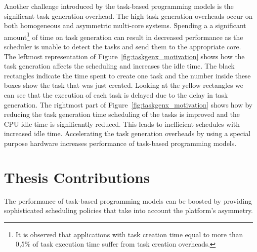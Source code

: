 Another challenge introduced by the task-based programming models is the significant task generation overhead.
The high task generation overheads occur on both homogeneous and asymmetric multi-core systems.
Spending a a significant amount\footnote{It is observed that applications with task creation time equal to more than 0,5\% of task execution time suffer from task creation overheads.} of time on task generation can result in decreased performance as the scheduler is unable to detect the tasks and send them to the appropriate core.
The leftmost representation of Figure~\ref{fig:taskgenx_motivation} shows how the task generation affects the scheduling and increases the idle time.
The black rectangles indicate the time spent to create one task and the number inside these boxes show the task that was just created.
Looking at the yellow rectangles we can see that the execution of each task is delayed due to the delay in task generation.
The rightmost part of Figure~\ref{fig:taskgenx_motivation} shows how by reducing the task generation time scheduling of the tasks is improved and the CPU idle time is significantly reduced.
This leads to inefficient schedules with increased idle time.
Accelerating the task generation overheads by using a special purpose hardware increases performance of task-based programming models.

\section{Thesis Contributions}


The performance of task-based programming models can be boosted by providing sophisticated scheduling policies that take into account the platform's asymmetry.

